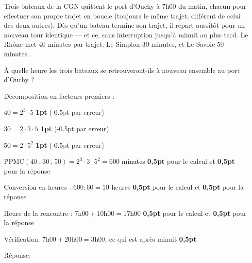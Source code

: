
\question[7]
Trois bateaux de la CGN quittent le port d'Ouchy à 7h00 du matin, chacun pour effectuer son propre trajet en boucle (toujours le même trajet, différent de celui des deux autres). Dès qu'un bateau termine son trajet, il repart aussitôt pour un nouveau tour identique — et ce, sans interruption jusqu'à minuit au plus tard. Le Rhône met 40 minutes par trajet, Le Simplon 30 minutes, et Le Savoie 50 minutes.

\vspace{10pt}À quelle heure les trois bateaux se retrouveront-ils à nouveau ensemble au port d'Ouchy ?

\vspace{10pt}{\footnotesize\raggedleft Espace pour ta démarche et tes calculs\par}
	\begin{solutionorgrid}[220pt]
	Décomposition en facteurs premiers :
	
	$40 = 2^3\cdot 5$ \hfill \textbf{1pt} (-0.5pt par erreur)
	
	$30 = 2\cdot 3\cdot 5$ \hfill \textbf{1pt} (-0.5pt par erreur)
	
	$50 = 2\cdot 5^2$ \hfill \textbf{1pt} (-0.5pt par erreur)

	\vspace{10pt}
	PPMC$(40\,;\,30\,;\,50) = 2^3\cdot 3\cdot 5^2 = 600$ minutes \hfill \textbf{0,5pt} pour le calcul et \textbf{0,5pt} pour la réponse

	\vspace{10pt}
	Conversion en heures : $600 : 60 = 10$ heures \hfill \textbf{0,5pt} pour le calcul et \textbf{0,5pt} pour la réponse
	
	\vspace{10pt}
	Heure de la rencontre : $7\text{h}00 + 10\text{h}00 = 17\text{h}00$  \hfill \textbf{0,5pt} pour le calcul et \textbf{0,5pt} pour la réponse
	
	\vspace{10pt}
	Vérification: $7\text{h}00 + 20\text{h}00 = 3\text{h}00$, ce qui est après minuit  \hfill \textbf{0,5pt}
	\end{solutionorgrid}
	
\begin{tcolorbox}[enhanced jigsaw, interior hidden, colframe=box, parbox=false]%
Réponse: 
\end{tcolorbox}
